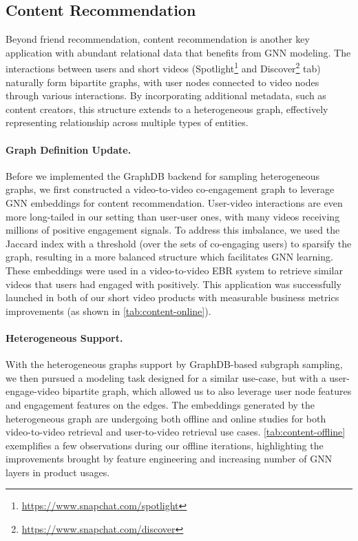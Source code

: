 



\subsection{Content Recommendation}

Beyond friend recommendation, content recommendation is another key application with abundant relational data that benefits from GNN modeling. The interactions between users and short videos (Spotlight\footnote{\url{https://www.snapchat.com/spotlight}} and Discover\footnote{\url{https://www.snapchat.com/discover}} tab) naturally form bipartite graphs, with user nodes connected to video nodes through various interactions. By incorporating additional metadata, such as content creators, this structure extends to a heterogeneous graph, effectively representing relationship across multiple types of entities. 

\paragraph{Graph Definition Update.}
Before we implemented the GraphDB backend for sampling heterogeneous graphs, we first constructed a video-to-video co-engagement graph to leverage GNN embeddings for content recommendation.
User-video interactions are even more long-tailed in our setting than user-user ones, with many videos receiving millions of positive engagement signals. To address this imbalance, we used the Jaccard index with a threshold (over the sets of co-engaging users) to sparsify the graph, resulting in a more balanced structure which facilitates GNN learning.  
These embeddings were used in a video-to-video EBR system to retrieve similar videos that users had engaged with positively. This application was successfully launched in both of our short video products with measurable business metrics improvements (as shown in \cref{tab:content-online}).

\paragraph{Heterogeneous Support.}
With the heterogeneous graphs support by GraphDB-based subgraph sampling, we then pursued a modeling task designed for a similar use-case, but with a user-engage-video bipartite graph, which allowed us to also leverage user node features and engagement features on the edges.
The embeddings generated by the heterogeneous graph are undergoing both offline and online studies for both video-to-video retrieval and user-to-video retrieval use cases. \cref{tab:content-offline} exemplifies a few observations during our offline iterations, highlighting the improvements brought by feature engineering and increasing number of GNN layers in product usages.  

